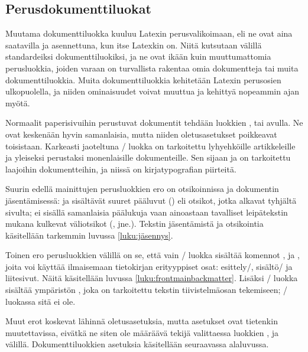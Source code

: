 \subsection{Perusdokumenttiluokat}
\label{luku:perusdokumenttiluokat}

Muutama dokumenttiluokka kuuluu Latexin perusvalikoimaan, eli ne ovat
aina saatavilla ja asennettuna, kun itse Latexkin on. Niitä kutsutaan
välillä standardeiksi dokumenttiluokiksi, ja ne ovat ikään kuin
muuttumattomia perusluokkia, joiden varaan on turvallista rakentaa omia
dokumentteja tai muita dokumenttiluokkia. Muita dokumenttiluokkia
kehitetään Latexin perusosien ulkopuolella, ja niiden ominaisuudet
voivat muuttua ja kehittyä nopeammin ajan myötä.

Normaalit paperisivuihin perustuvat dokumentit tehdään luokkien
,  tai  avulla. Ne ovat
keskenään hyvin samanlaisia, mutta niiden oletusasetukset poikkeavat
toisistaan. Karkeasti jaoteltuna \-/ luokka on
tarkoitettu lyhyehköille artikkeleille ja yleiseksi perustaksi
monenlaisille dokumenteille. Sen sijaan  ja 
on tarkoitettu laajoihin dokumentteihin, ja niissä on kirjatypografian
piirteitä.

Suurin edellä mainittujen perusluokkien ero on otsikoinnissa ja
dokumentin jäsentämisessä:  ja  sisältävät
suuret pääluvut () eli otsikot, jotka alkavat tyhjältä
sivulta;  ei sisällä samanlaisia päälukuja vaan
ainoastaan tavalliset leipätekstin mukana kulkevat väliotsikot
(,  jne.). Tekstin jäsentämistä ja
otsikointia käsitellään tarkemmin luvussa \ref{luku:jäsennys}.

Toinen ero perusluokkien välillä on se, että vain \-/
luokka sisältää komennot ,  ja
, joita voi käyttää ilmaisemaan tietokirjan
erityyppiset osat: esittely\-/, sisältö\-/{} ja liitesivut. Näitä
käsitellään luvussa \ref{luku:frontmainbackmatter}. Lisäksi
\-/ luokka sisältää ympäristön , joka
on tarkoitettu tekstin tiivistelmäosan tekemiseen; \-/
luokassa sitä ei ole.

Muut erot koskevat lähinnä oletusasetuksia, mutta asetukset ovat
tietenkin muutettavissa, eivätkä ne siten ole määräävä tekijä
valittaessa luokkien ,  ja 
välillä. Dokumenttiluokkien asetuksia käsitellään seuraavassa
alaluvussa.

